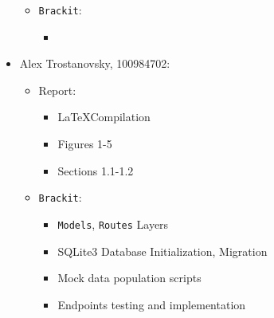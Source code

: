 \documentclass{article}
\begin{document}
\begin{itemize}
{\begin{itemize}
{            }
            \item{\texttt{Brackit}: 
                \begin{itemize}
                    \item{}
                \end{itemize}
            }            
        \end{itemize}
    }
    \item{Alex Trostanovsky, 100984702: 
        \begin{itemize}
            \item{Report: 
                \begin{itemize}
                    \item{\LaTeX Compilation}
                    \item{Figures 1-5}
                    \item{Sections 1.1-1.2}
                \end{itemize}
            }
            \item{\texttt{Brackit}: 
                \begin{itemize}
                    \item{\texttt{Models}, \texttt{Routes} Layers}
                    \item{SQLite3 Database Initialization, Migration}
                    \item{Mock data population scripts}
                    \item{Endpoints testing and implementation}
                \end{itemize}
            }    
        \end{itemize}
    }
    
\end{itemize}

\clearpage


\end{document}
